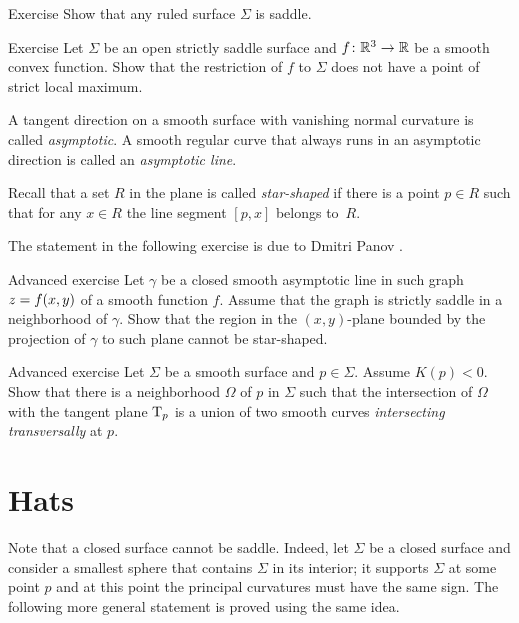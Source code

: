 \begin{thm}{Exercise}\label{ex:ruled=>saddle}
Show that any ruled surface $\Sigma$ is saddle.
\end{thm}

\begin{thm}{Exercise}\label{ex:saddle-convex}
Let $\Sigma$ be an open strictly saddle surface and $f\:\mathbb{R}^3\z\to\mathbb{R}$ be a smooth convex function.
Show that the restriction of $f$ to $\Sigma$ does not have a point of strict local maximum.
\end{thm}

A tangent direction on a smooth surface with vanishing normal curvature is called \emph{asymptotic}.
A smooth regular curve that always runs in an asymptotic direction is called an
{}\emph{asymptotic line}.\label{page:asymptotic line}

Recall that a set $R$ in the plane is called \emph{star-shaped} if there is a point $p\in R$ such that for any $x\in R$ the line segment $[p,x]$ belongs to~$R$.

The statement in the following exercise is due to Dmitri Panov \cite{panov-curves}.

\begin{thm}{Advanced exercise}\label{ex:panov}
Let $\gamma$ be a closed smooth asymptotic line
in such graph $z\z=f(x,y)$ of a smooth function $f$. 
Assume that the graph is strictly saddle in a neighborhood of $\gamma$.
Show that the region in the $(x,y)$-plane bounded by the projection of $\gamma$ to such plane cannot be star-shaped. 
\end{thm}

\begin{thm}{Advanced exercise}\label{ex:crosss}
Let $\Sigma$ be a smooth surface and $p\in \Sigma$.
Assume $K(p)<0$.
Show that there is a neighborhood $\Omega$ of $p$ in $\Sigma$
such that the intersection of $\Omega$ with the tangent plane $\mathrm{T}_p$ is a union of two smooth curves  \emph{intersecting transversally} at $p$.
\end{thm}


\section{Hats}

Note that a closed surface cannot be saddle.
Indeed, let $\Sigma$ be a closed surface and consider a smallest sphere that contains $\Sigma$ in its interior;
it supports $\Sigma$ at some point $p$ and at this point the principal curvatures must have the same sign.
The following more general statement  is proved using the same idea.

